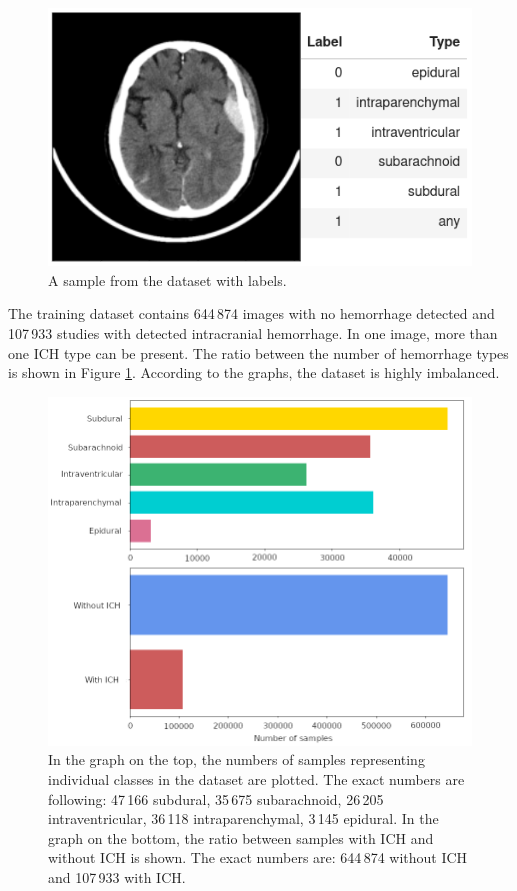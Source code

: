 \documentclass[thesis=B,english]{FITthesis}[2019/12/23]
\begin{document}
\begin{figure}[ht]
		\includegraphics[scale=2.1]{images/dataset_sample.png}
		\centering
		\caption{A sample from the dataset with labels.}
\end{figure}

The training dataset contains  644\,874 images with no hemorrhage detected and 107\,933 studies with detected intracranial hemorrhage. In one image, more than one ICH type can be present. The ratio between the number of hemorrhage types is shown in Figure \ref{fig:types_ratio}. According to the graphs, the dataset is highly imbalanced.

\begin{figure}[ht]
		\includegraphics[scale=0.43]{images/num_classes.png}
		\centering
		\caption{In the graph on the top, the numbers of samples representing individual classes in the dataset are plotted. The exact numbers are following: 47\,166 subdural,  35\,675 subarachnoid, 26\,205 intraventricular, 36\,118 intraparenchymal, 3\,145 epidural. In the graph on the bottom, the ratio between samples with ICH and without ICH is shown. The exact numbers are: 644\,874 without ICH and 107\,933 with ICH.}
		\label{fig:types_ratio}
\end{figure}
\end{document}
